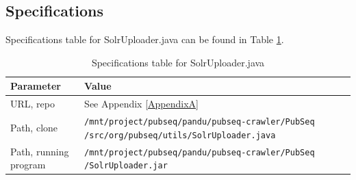\subsection{Specifications}

Specifications table for SolrUploader.java can be found in Table \ref{tab:SolrUploader}.

\begin{table}[htbp]
\caption{Specifications table for SolrUploader.java}
\centering
\begin{tabularx}{\textwidth}{ | l | X | }
  \hline
  Parameter & Value \\
  \hline
  URL, repo & See Appendix \ref{AppendixA} \\
  Path, clone & \texttt{/mnt/project/pubseq/pandu/pubseq-crawler/PubSeq /src/org/pubseq/utils/SolrUploader.java} \\
  Path, running program & \texttt{/mnt/project/pubseq/pandu/pubseq-crawler/PubSeq /SolrUploader.jar}\\
  \hline
\end{tabularx}
\label{tab:SolrUploader}
\end{table}